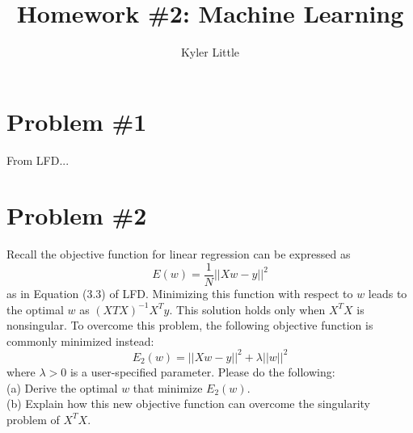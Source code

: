 \documentclass[12pt]{article}
\author{Kyler Little}
\title{Homework \#2: Machine Learning}
\begin{document}
	\maketitle
	\section*{Problem \#1}
	From LFD...
	\section*{Problem \#2}
	Recall the objective function for linear regression can be expressed as 
	\begin{equation}
	E(w) = \frac{1}{N} ||Xw-y||^2
	\end{equation}
	as in Equation (3.3) of LFD. Minimizing this function with respect to $w$ leads to the optimal
	$w$ as $(X T X)^{-1} X^T y$. This solution holds only when $X^TX$ is nonsingular. To overcome this problem, the following objective function is commonly minimized instead:
	\begin{equation}
	E_2(w) = ||Xw-y||^2 + \lambda ||w||^2
	\end{equation}
	where $\lambda > 0$ is a user-specified parameter. Please do the following: \\
	(a) Derive the optimal $w$ that minimize $E_2(w)$.\\
	(b) Explain how this new objective function can overcome the singularity problem
	of $X^T X$.
	
\end{document}
